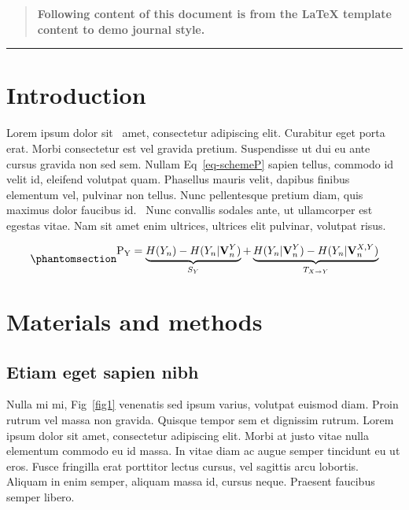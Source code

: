 \documentclass[
  10pt,
  letterpaper,
]{article}
\begin{document}
\begin{quote}
\textbf{Following content of this document is from the LaTeX template
content to demo journal style.}
\end{quote}

\begin{center}\rule{0.5\linewidth}{0.5pt}\end{center}

\section{Introduction}\label{introduction}

Lorem ipsum dolor sit~\citep{bib1} amet, consectetur adipiscing elit.
Curabitur eget porta erat. Morbi consectetur est vel gravida pretium.
Suspendisse ut dui eu ante cursus gravida non sed sem. Nullam
Eq~\ref{eq-schemeP} sapien tellus, commodo id velit id, eleifend
volutpat quam. Phasellus mauris velit, dapibus finibus elementum vel,
pulvinar non tellus. Nunc pellentesque pretium diam, quis maximus dolor
faucibus id.~\citep{bib2} Nunc convallis sodales ante, ut ullamcorper
est egestas vitae. Nam sit amet enim ultrices, ultrices elit pulvinar,
volutpat risus.

\begin{equation}\phantomsection\label{eq-schemeP}{
\begin{aligned}
\mathrm{P_Y} = \underbrace{H(Y_n) - H(Y_n|\mathbf{V}^{Y}_{n})}_{S_Y} + \underbrace{H(Y_n|\mathbf{V}^{Y}_{n})- H(Y_n|\mathbf{V}^{X,Y}_{n})}_{T_{X\rightarrow Y}}
\end{aligned}
}\end{equation}

\section{Materials and methods}\label{materials-and-methods}

\subsection{Etiam eget sapien nibh}\label{etiam-eget-sapien-nibh}

Nulla mi mi, Fig~\ref{fig1} venenatis sed ipsum varius, volutpat euismod
diam. Proin rutrum vel massa non gravida. Quisque tempor sem et
dignissim rutrum. Lorem ipsum dolor sit amet, consectetur adipiscing
elit. Morbi at justo vitae nulla elementum commodo eu id massa. In vitae
diam ac augue semper tincidunt eu ut eros. Fusce fringilla erat
porttitor lectus cursus, vel sagittis arcu lobortis. Aliquam in enim
semper, aliquam massa id, cursus neque. Praesent faucibus semper libero.
\end{document}
